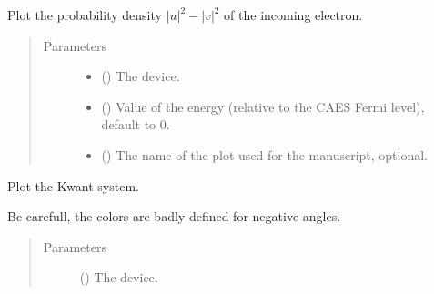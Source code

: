 \documentclass[letterpaper,10pt,english]{sphinxmanual}
\begin{document}

\begin{fulllineitems}
\label{\detokenize{modules:modules.utils.plot_density}}
\pysigstartsignatures
{}
\pysigstopsignatures
\sphinxAtStartPar
Plot the probability density \(|u|^2 - |v|^2\) of the incoming electron.
\begin{quote}\begin{description}
\item[{Parameters}] \leavevmode\begin{itemize}
\item {} 
\sphinxAtStartPar
{} () \textendash{} The device.

\item {} 
\sphinxAtStartPar
{} () \textendash{} Value of the energy (relative to the CAES Fermi level), default to 0.

\item {} 
\sphinxAtStartPar
{} () \textendash{} The name of the plot used for the manuscript, optional.

\end{itemize}

\end{description}\end{quote}

\end{fulllineitems}


\begin{fulllineitems}
\label{\detokenize{modules:modules.utils.plot_device}}
\pysigstartsignatures
{}
\pysigstopsignatures
\sphinxAtStartPar
Plot the Kwant system.

\sphinxAtStartPar
Be carefull, the colors are badly defined for negative angles.
\begin{quote}\begin{description}
\item[{Parameters}] \leavevmode
\sphinxAtStartPar
{} () \textendash{} The device.

\end{description}\end{quote}

\end{fulllineitems}
\end{document}
